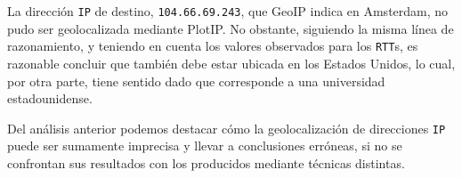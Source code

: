 La dirección \texttt{IP} de destino, \texttt{104.66.69.243}, que GeoIP indica
en Amsterdam, no pudo ser geolocalizada mediante PlotIP. No obstante,
siguiendo la misma línea de razonamiento, y teniendo en cuenta los valores
observados para los \texttt{RTT}s, es razonable concluir que también debe
estar ubicada en los Estados Unidos, lo cual, por otra parte, tiene sentido
dado que corresponde a una universidad estadounidense.

Del análisis anterior podemos destacar cómo la geolocalización de direcciones
\texttt{IP} puede ser sumamente imprecisa y llevar a conclusiones erróneas,
si no se confrontan sus resultados con los producidos mediante técnicas
distintas.
